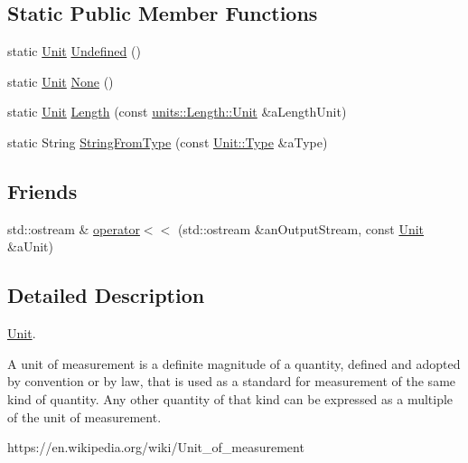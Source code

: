 \subsection*{Static Public Member Functions}
\begin{DoxyCompactItemize}
\item 
static \hyperlink{classlibrary_1_1physics_1_1_unit}{Unit} \hyperlink{classlibrary_1_1physics_1_1_unit_a9fb6d8c10aefa9a13cff18cf6d6e5733}{Undefined} ()
\item 
static \hyperlink{classlibrary_1_1physics_1_1_unit}{Unit} \hyperlink{classlibrary_1_1physics_1_1_unit_ab25dd57cb71168898324ac78b43374ac}{None} ()
\item 
static \hyperlink{classlibrary_1_1physics_1_1_unit}{Unit} \hyperlink{classlibrary_1_1physics_1_1_unit_aa7402b752586ccd442d56cf340ee9c7a}{Length} (const \hyperlink{classlibrary_1_1physics_1_1units_1_1_length_a3b8b39cd245cf6b19dc34459baeccb18}{units\+::\+Length\+::\+Unit} \&a\+Length\+Unit)
\item 
static String \hyperlink{classlibrary_1_1physics_1_1_unit_a97162c115f15f4eb2221dd65f36cd128}{String\+From\+Type} (const \hyperlink{classlibrary_1_1physics_1_1_unit_ab01b0024991fd80f3e5ef7c8282fccc1}{Unit\+::\+Type} \&a\+Type)
\end{DoxyCompactItemize}
\subsection*{Friends}
\begin{DoxyCompactItemize}
\item 
std\+::ostream \& \hyperlink{classlibrary_1_1physics_1_1_unit_a70630a82d569152709a999efabdb3e4f}{operator$<$$<$} (std\+::ostream \&an\+Output\+Stream, const \hyperlink{classlibrary_1_1physics_1_1_unit}{Unit} \&a\+Unit)
\end{DoxyCompactItemize}


\subsection{Detailed Description}
\hyperlink{classlibrary_1_1physics_1_1_unit}{Unit}. 

A unit of measurement is a definite magnitude of a quantity, defined and adopted by convention or by law, that is used as a standard for measurement of the same kind of quantity. Any other quantity of that kind can be expressed as a multiple of the unit of measurement.

https\+://en.wikipedia.\+org/wiki/\+Unit\+\_\+of\+\_\+measurement 

